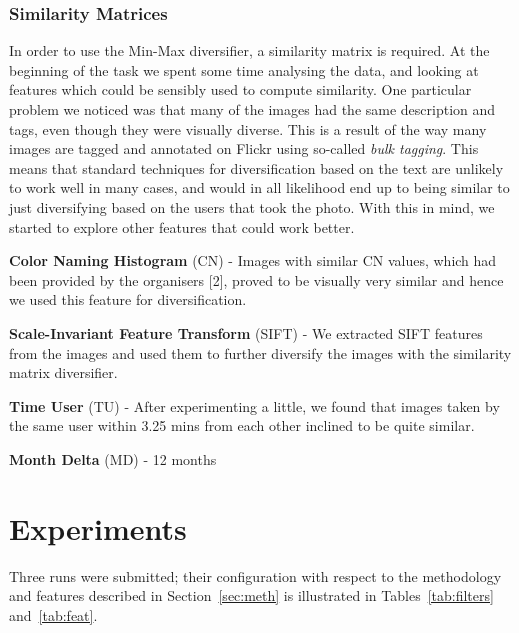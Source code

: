 \documentclass{../acm_proc_article-me11_tweaked}
\begin{document}
\subsubsection{Similarity Matrices}
In order to use the Min-Max diversifier, a similarity matrix is required. At the beginning of the task we spent some time analysing the data, and looking at features which could be sensibly used  to compute similarity. One particular problem we noticed was that many of the images had the same description and tags, even though they were visually diverse. This is a result of the way many images are tagged and annotated on Flickr using so-called \emph{bulk tagging}. This means that standard techniques for diversification based on the text are unlikely to work well in many cases, and would in all likelihood end up to being similar to just diversifying based on the users that took the photo. With this in mind, we started to explore other features that could work better. 

\vspace{\baselineskip}\vspace{-\parskip}

\noindent \textbf{Color Naming Histogram} (CN) - 
Images with similar CN values, which had been provided by the organisers [2], proved to be visually very similar and hence we used this feature for diversification.

\noindent \textbf{Scale-Invariant Feature Transform} (SIFT) - 
We extracted SIFT features from the images and used them to further diversify the images with the similarity matrix diversifier.

\noindent \textbf{Time User} (TU) - 
After experimenting a little, we found that images taken by the same user within 3.25 mins from each other inclined to be quite similar.

\noindent \textbf{Month Delta} (MD) - 
12 months

\section{Experiments}\label{sec:exp}
Three runs were submitted; their configuration with respect to the methodology and features described in Section~\ref{sec:meth} is illustrated in Tables~\ref{tab:filters} and~\ref{tab:feat}.
\end{document}
